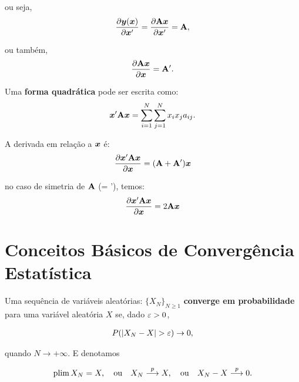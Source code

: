 \documentclass[11pt, oneside, a4paper, article]{article}
\numberwithin{equation}{section}
\begin{document}
\begin{description}
\noindent
ou seja,
\begin{align*}
	\frac{\partial\boldsymbol{y}(\boldsymbol{x})}{\partial\boldsymbol{x}'} = \frac{\partial\mathbf{A} \boldsymbol{x}}{\partial\boldsymbol{x}'} = \mathbf{A},
\end{align*}

\noindent
ou também,
\begin{align*}
	\frac{\partial\mathbf{A} \boldsymbol{x}}{\partial\boldsymbol{x}} = \mathbf{A}'.
\end{align*}

\vspace{1 em}
Uma \textbf{forma quadrática} pode ser escrita como:
\begin{align*}
\boldsymbol{x}' \mathbf{A} \boldsymbol{x} = \sum_{i=1}^{N}\sum_{j=1}^{N} x_{i} x_{j} a_{ij}.
\end{align*}

\noindent
A derivada em relação a $\boldsymbol{x}$ é:
\begin{align*}
	\frac{\partial\boldsymbol{x}' \mathbf{A} \boldsymbol{x}}{\partial\boldsymbol{x}} =  (\mathbf{A} + \mathbf{A}') \boldsymbol{x}
\end{align*}

\noindent
no caso de simetria de $\mathbf{A}$ (\Amat = \Amat'), temos:
\begin{align*}
	\frac{\partial\boldsymbol{x}' \mathbf{A} \boldsymbol{x}}{\partial\boldsymbol{x}} =  2\mathbf{A}\boldsymbol{x}
\end{align*}

\clearpage
\section{Conceitos Básicos de Convergência Estatística} \label{app:est}

\begin{defn}
	\citet[Def 3.3, p.36 ]{wool-2010}

	Uma sequência de variáveis aleatórias:
	$\{ X_{N} \}_{N \geq 1}$ 
	\textbf{converge em probabilidade} para uma variável aleatória $X$ se, dado $\varepsilon > 0$, 

	\vspace{-1 em}
	\begin{align*}
		P(| X_{N} - X | > \varepsilon ) \to 0,
	\end{align*}

	\noindent
	quando $N \to + \infty$.
	E denotamos

	\vspace{-1 em}
	\begin{align*}
		\text{plim} \, X_{N} = X,
		\quad \text{ou}	\quad
		X_{N}  \overset{p}{\longrightarrow}  X,
		\quad \text{ou}	\quad
		X_{N} - X  \overset{p}{\longrightarrow}  0.
	\end{align*}
\end{defn}


\end{description}
\end{document}
